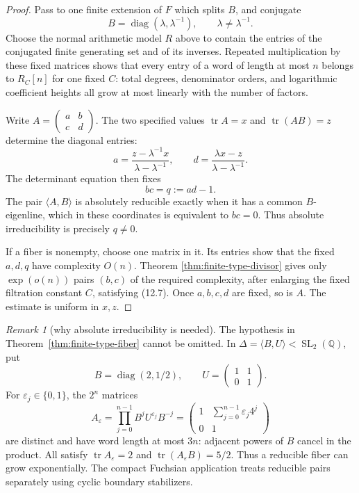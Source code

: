 \documentclass[11pt,reqno]{amsart}
\theoremstyle{definition}
\theoremstyle{remark}
\newtheorem{remark}[theorem]{Remark}
\newcommand{\Q}{\mathbb Q}
\newcommand{\Tr}{\operatorname{tr}}
\newcommand{\SL}{\operatorname{SL}}
\newcommand{\diag}{\operatorname{diag}}
\begin{document}
\begin{proof}
Pass to one finite extension of \(F\) which splits \(B\), and conjugate
\[
 B=\diag(\lambda,\lambda^{-1}),\qquad\lambda\ne\lambda^{-1}.
\]
Choose the normal arithmetic model \(R\) above to contain the entries of the
conjugated finite generating set and of its inverses.  Repeated multiplication
by these fixed matrices shows that every entry of a word of length at most
\(n\) belongs to \(R_C[n]\) for one fixed \(C\): total degrees, denominator
orders, and logarithmic coefficient heights all grow at most linearly with
the number of factors.

Write \(A=(\begin{smallmatrix}a&b\\c&d\end{smallmatrix})\).  The two
specified values \(\Tr A=x\) and \(\Tr(AB)=z\) determine the diagonal
entries:
\[
 a=\frac{z-\lambda^{-1}x}{\lambda-\lambda^{-1}},
 \qquad
 d=\frac{\lambda x-z}{\lambda-\lambda^{-1}}.
\tag{12.6}
\]
The determinant equation then fixes
\[
 bc=q:=ad-1.
\tag{12.7}
\]
The pair \(\langle A,B\rangle\) is absolutely reducible exactly when it has
a common \(B\)-eigenline, which in these coordinates is equivalent to
\(bc=0\).  Thus absolute irreducibility is precisely \(q\ne0\).

If a fiber is nonempty, choose one matrix in it.  Its entries show that the
fixed \(a,d,q\) have complexity \(O(n)\).  Theorem
\ref{thm:finite-type-divisor} gives only \(\exp(o(n))\) pairs \((b,c)\) of
the required complexity, after enlarging the fixed filtration constant
\(C\), satisfying (12.7).  Once \(a,b,c,d\) are fixed, so
is \(A\).  The estimate is uniform in \(x,z\).
\end{proof}

\begin{remark}[why absolute irreducibility is needed]
The hypothesis in Theorem~\ref{thm:finite-type-fiber} cannot be omitted.
In \(\Delta=\langle B,U\rangle<\SL_2(\Q)\), put
\[
 B=\diag(2,1/2),\qquad
 U=\begin{pmatrix}1&1\\0&1\end{pmatrix}.
\]
For \(\varepsilon_j\in\{0,1\}\), the \(2^n\) matrices
\[
 A_{\varepsilon}
 =\prod_{j=0}^{n-1}B^jU^{\varepsilon_j}B^{-j}
 =\begin{pmatrix}1&\sum_{j=0}^{n-1}\varepsilon_j4^j\\0&1\end{pmatrix}
\]
are distinct and have word length at most \(3n\): adjacent powers of
\(B\) cancel in the product.  All satisfy
\(\Tr A_{\varepsilon}=2\) and \(\Tr(A_{\varepsilon}B)=5/2\).
Thus a reducible fiber can grow exponentially.  The compact Fuchsian
application treats reducible pairs separately using cyclic boundary
stabilizers.
\end{remark}
\end{document}
